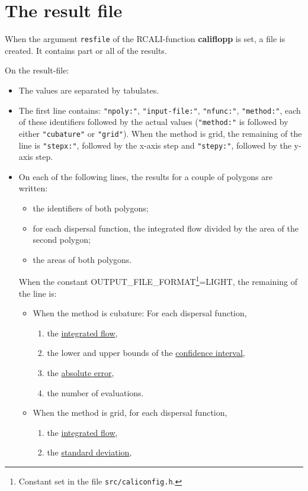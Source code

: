 \documentclass[a4paper,twoside,openright]{report}
\begin{document}
\section{The result file}
\label{result-file}
\hypertarget{FICRES}{}
When the argument \texttt{resfile}
of the RCALI-function \textbf{califlopp} is set, a file is created.
It contains part or all of the results.

On the result-file: 

\begin{itemize}
\item
The values are separated by tabulates.
\item
The first line contains:
  \texttt{"npoly:"},
\texttt{"input-file:"},
\texttt{"nfunc:"},
\texttt{"method:"}, each of these identifiers
      followed by the actual values
(\texttt{"method:"} is followed by either
\texttt{"cubature"} or \texttt{"grid"}).
\newline
When the method is grid, the remaining of the line is
\texttt{"stepx:"}, followed by the x-axis step and
 \texttt{"stepy:"}, followed by the y-axis step.
\item
On each of the following lines, the results for a couple of
      polygons are written:
\begin{itemize}
\item
the identifiers of both polygons;
\item
for each  dispersal function,
the integrated flow
divided by the area of the second polygon;
\item
the areas of both polygons.
\end{itemize}
\label{OUTPUT_FORMAT}
When the constant
OUTPUT\_FILE\_FORMAT\footnote{
Constant set in the file \texttt{src/caliconfig.h}.
}=LIGHT, the remaining of the line is:

\begin{itemize}
\item When the method is cubature:
For each dispersal function, 
\begin{enumerate}
\item 
the  
\hyperlink{cubmean}{integrated flow},
\item 
the lower and upper bounds of the 
\hyperlink{cubic}{confidence interval},
\item 
the \hyperlink{abser}{absolute error},
\item 
the number of evaluations.
\end{enumerate}
\item When the method is grid, for each dispersal function, 
\begin{enumerate}
\item 
the \hyperlink{gridmean}{integrated flow},
\item 
the \hyperlink{gridet}{standard deviation},
\end{enumerate}

\end{itemize}
\end{itemize}
\end{document}

